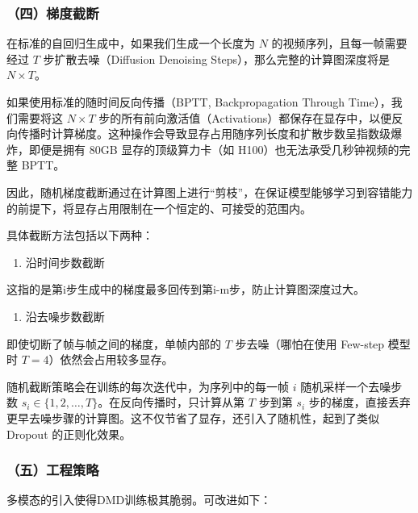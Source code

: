 \hypertarget{ux56dbux68afux5ea6ux622aux65ad}{%
\subsubsection{（四）梯度截断}\label{ux56dbux68afux5ea6ux622aux65ad}}

在标准的自回归生成中，如果我们生成一个长度为 \(N\) 的视频序列，且每一帧需要经过 \(T\) 步扩散去噪（Diffusion Denoising Steps），那么完整的计算图深度将是 \(N\times T\)。

如果使用标准的随时间反向传播（BPTT, Backpropagation Through Time），我们需要将这 \(N\times T\) 步的所有前向激活值（Activations）都保存在显存中，以便反向传播时计算梯度。这种操作会导致显存占用随序列长度和扩散步数呈指数级爆炸，即便是拥有 80GB 显存的顶级算力卡（如 H100）也无法承受几秒钟视频的完整 BPTT。

因此，随机梯度截断通过在计算图上进行``剪枝''，在保证模型能够学习到容错能力的前提下，将显存占用限制在一个恒定的、可接受的范围内。

具体截断方法包括以下两种：

\begin{enumerate}
\def\labelenumi{\arabic{enumi}.}
\tightlist
\item
  沿时间步数截断
\end{enumerate}

这指的是第i步生成中的梯度最多回传到第i-m步，防止计算图深度过大。

\begin{enumerate}
\def\labelenumi{\arabic{enumi}.}
\setcounter{enumi}{1}
\tightlist
\item
  沿去噪步数截断
\end{enumerate}

即使切断了帧与帧之间的梯度，单帧内部的 \(T\) 步去噪（哪怕在使用 Few-step 模型时 \(T=4\)）依然会占用较多显存。

随机截断策略会在训练的每次迭代中，为序列中的每一帧 \(i\) 随机采样一个去噪步数 \(s_i\in\{1,2,\ldots,T\}\)。在反向传播时，只计算从第 \(T\) 步到第 \(s_i\) 步的梯度，直接丢弃更早去噪步骤的计算图。这不仅节省了显存，还引入了随机性，起到了类似 Dropout 的正则化效果。

\hypertarget{ux4e94ux5de5ux7a0bux7b56ux7565}{%
\subsubsection{（五）工程策略}\label{ux4e94ux5de5ux7a0bux7b56ux7565}}

多模态的引入使得DMD训练极其脆弱。可改进如下：


